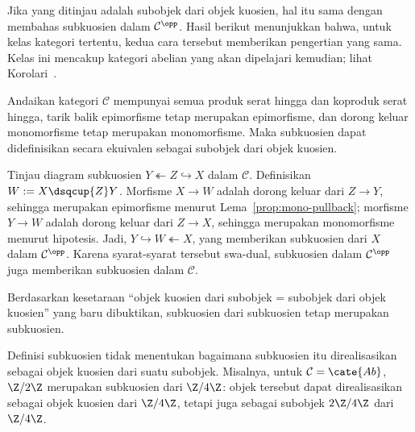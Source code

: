 Jika yang ditinjau adalah subobjek dari objek kuosien, hal itu sama dengan
membahas subkuosien dalam $\mathcal{C}^{\opp}$. Hasil berikut menunjukkan
bahwa, untuk kelas kategori tertentu, kedua cara tersebut memberikan pengertian
yang sama. Kelas ini mencakup kategori abelian yang akan dipelajari kemudian;
lihat Korolari~.

\begin{proposisi}\label{prop:subquotient-equiv}
	Andaikan kategori $\mathcal{C}$ mempunyai semua produk serat hingga dan
	koproduk serat hingga, tarik balik epimorfisme tetap merupakan
	epimorfisme, dan dorong keluar monomorfisme tetap merupakan monomorfisme.
	Maka subkuosien dapat didefinisikan secara ekuivalen sebagai subobjek dari
	objek kuosien.
\end{proposisi}

\begin{bukti}
	Tinjau diagram subkuosien $Y \twoheadleftarrow Z \hookrightarrow X$ dalam
	$\mathcal{C}$. Definisikan $W := X \dsqcup{Z} Y$. Morfisme $X \to W$ adalah
	dorong keluar dari $Z \to Y$, sehingga merupakan epimorfisme menurut
	Lema~\ref{prop:mono-pullback}; morfisme $Y \to W$ adalah dorong keluar dari
	$Z \to X$, sehingga merupakan monomorfisme menurut hipotesis. Jadi,
	$Y \hookrightarrow W \twoheadleftarrow X$, yang memberikan subkuosien dari
	$X$ dalam $\mathcal{C}^{\opp}$. Karena syarat-syarat tersebut swa-dual,
	subkuosien dalam $\mathcal{C}^{\opp}$ juga memberikan subkuosien dalam
	$\mathcal{C}$.
\end{bukti}

Berdasarkan kesetaraan ``objek kuosien dari subobjek = subobjek dari objek
kuosien'' yang baru dibuktikan, subkuosien dari subkuosien tetap merupakan
subkuosien.

Definisi subkuosien tidak menentukan bagaimana subkuosien itu direalisasikan
sebagai objek kuosien dari suatu subobjek. Misalnya, untuk
$\mathcal{C} = \cate{Ab}$, $\Z/2\Z$ merupakan subkuosien dari $\Z/4\Z$:
objek tersebut dapat direalisasikan sebagai objek kuosien dari $\Z/4\Z$,
tetapi juga sebagai subobjek $2\Z/4\Z$ dari $\Z/4\Z$.
